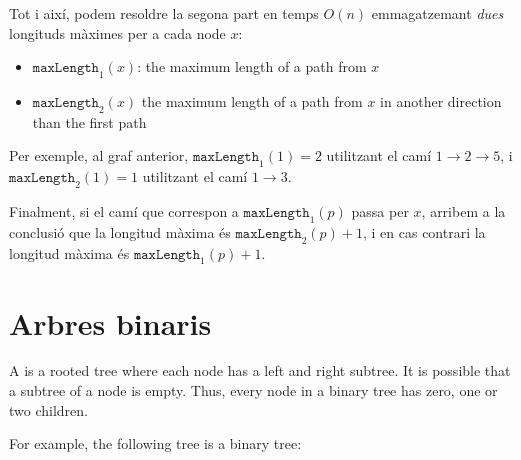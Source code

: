 Tot i així, podem resoldre la segona part en temps $O(n)$
emmagatzemant \emph{dues} longituds màximes per a cada node $x$:
\begin{itemize}
\item $\texttt{maxLength}_1(x)$:
the maximum length of a path from $x$
\item $\texttt{maxLength}_2(x)$
the maximum length of a path from $x$
in another direction than the first path
\end{itemize}
Per exemple, al graf anterior, $\texttt{maxLength}_1(1)=2$ utilitzant
el camí $1 \rightarrow 2 \rightarrow 5$, i $\texttt{maxLength}_2(1)=1$
utilitzant el camí $1 \rightarrow 3$.

Finalment, si el camí que correspon a $\texttt{maxLength}_1(p)$ passa
per $x$, arribem a la conclusió que la longitud màxima és
$\texttt{maxLength}_2(p)+1$, i en cas contrari la longitud màxima és
$\texttt{maxLength}_1(p)+1$.



\section{Arbres binaris}



\begin{samepage}
A  is a rooted tree
where each node has a left and right subtree.
It is possible that a subtree of a node is empty.
Thus, every node in a binary tree has
zero, one or two children.

For example, the following tree is a binary tree:
\begin{center}
\end{center}
\end{samepage}


  

